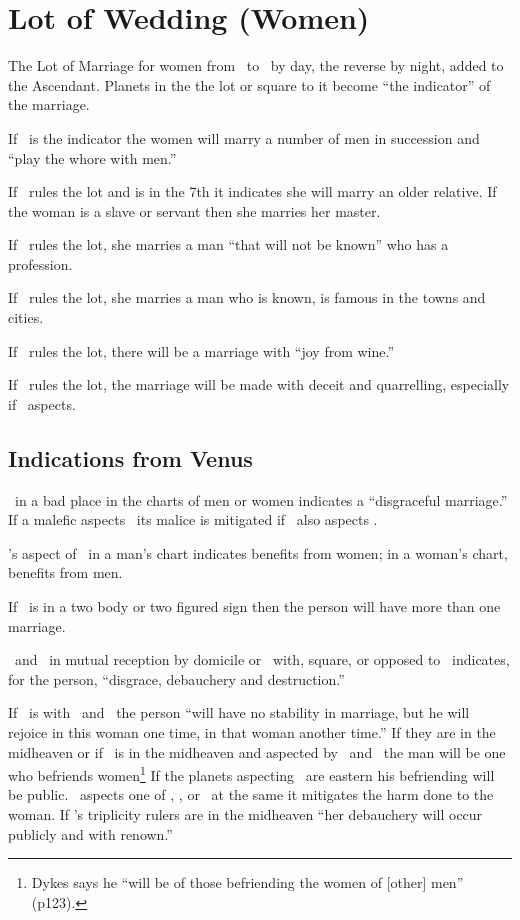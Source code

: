 \section{Lot of Wedding (Women)}
The Lot of Marriage for women from \Venus\, to \Saturn\, by day, the reverse by night, added to the Ascendant. Planets in the the lot or square to it become ``the indicator'' of the marriage.

If \Mars\, is the indicator the women will marry a number of men in succession and ``play the whore with men.''

If \Saturn\, rules the lot and is in the 7th it indicates she will marry an older relative. If the woman is a slave or servant then she marries her master.

If \Mars\, rules the lot, she marries a man ``that will not be known'' who has a \Mars\, profession.

If \Jupiter\, rules the lot, she marries a man who is known, is famous in the towns and cities.

If \Venus\, rules the lot, there will be a marriage with ``joy from wine.''

If \Mercury\ rules the lot, the marriage will be made with deceit and quarrelling, especially if \Mars\, aspects.

\subsection{Indications from Venus}
\Venus\, in a bad place in the charts of men or women indicates a ``disgraceful marriage.'' If a malefic aspects \Venus\, its malice is mitigated if \Jupiter\, also aspects \Venus. 

\Jupiter's aspect of \Venus\, in a man's chart indicates benefits from women; in a woman's chart, benefits from men.

If \Venus\, is in a two body or two figured sign then the person will have more than one marriage.

\Venus\, and \Mars\, in mutual reception by domicile or \Mars\, with, square, or opposed to \Venus\, indicates, for the person, ``disgrace, debauchery and destruction.''

If \Venus\, is with \Mercury\, and \Mars\, the person ``will have no stability in marriage, but he will rejoice in this woman one time, in that woman another time.'' If they are in the midheaven or if \Venus\, is in the midheaven and aspected by \Mercury\, and \Mars\, the man will be one who befriends women\footnote{Dykes says he ``will be of those befriending the women of [other] men'' (p123).} If the planets aspecting \Venus\, are eastern his befriending will be public. \Jupiter\, aspects one of \Venus, \Mercury, or \Mars\, at the same it mitigates the harm done to the woman. If \Venus's triplicity rulers are in the midheaven ``her debauchery will occur publicly and with renown.''

